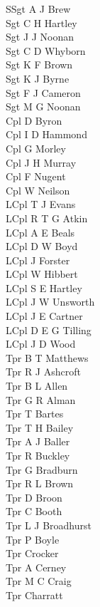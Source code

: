 \documentclass[a4paper,7pt]{book}
\begin{document}
\begin{multicols}{4}
  \scriptsize
  \noindent
  SSgt A J Brew \\
  Sgt C H Hartley \\
  Sgt J J Noonan \\
  Sgt C D Whyborn \\
  Sgt K F Brown \\
  Sgt K J Byrne \\
  Sgt F J Cameron \\
  Sgt M G Noonan \\
  Cpl D Byron \\
  Cpl I D Hammond \\
  Cpl G Morley \\
  Cpl J H Murray \\
  Cpl F Nugent \\
  Cpl W Neilson \\
  LCpl T J Evans \\
  LCpl R T G Atkin \\
  LCpl A E Beals \\
  LCpl D W Boyd \\
  LCpl J Forster \\
  LCpl W Hibbert \\
  LCpl S E Hartley \\
  LCpl J W Unsworth \\
  LCpl J E Cartner \\
  LCpl D E G Tilling \\
  LCpl J D Wood \\
  Tpr B T Matthews \\
  Tpr R J Ashcroft \\
  Tpr B L Allen \\
  Tpr G R Alman \\
  Tpr T Bartes \\
  Tpr T H Bailey \\
  Tpr A J Baller \\
  Tpr R Buckley \\
  Tpr G Bradburn \\
  Tpr R L Brown \\
  Tpr D Broon \\
  Tpr C Booth \\
  Tpr L J Broadhurst \\
  Tpr P Boyle \\
  Tpr Crocker \\
  Tpr A Cerney \\
  Tpr M C Craig \\
  Tpr Charratt \\

\end{multicols}
\end{document}

